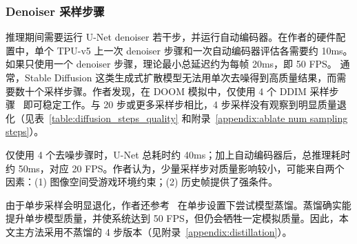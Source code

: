 \documentclass{article} %
\begin{document}
\subsubsection{Denoiser 采样步骤}
推理期间需要运行 U-Net denoiser 若干步，并运行自动编码器。在作者的硬件配置中，单个 TPU-v5 上一次 denoiser 步骤和一次自动编码器评估各需要约 10ms。如果只使用一个 denoiser 步骤，理论最小总延迟约为每帧 20ms，即 50 FPS。
通常，Stable Diffusion 这类生成式扩散模型无法用单次去噪得到高质量结果，而需要数十个采样步骤。作者发现，在 DOOM 模拟中，仅使用 4 个 DDIM 采样步骤~\citep{song2020denoising} 即可稳定工作。与 20 步或更多采样步相比，4 步采样没有观察到明显质量退化（见表~\ref{table:diffusion_steps_quality} 和附录~\ref{appendix:ablate num sampling steps}）。
\begin{table}[h]
\caption{\textbf{不同采样步数下的生成。} 使用 PSNR 和 LPIPS 指标评价 GameNGen 在不同采样步数下的生成质量。“D”表示一步蒸馏模型。更多细节见附录~\ref{appendix:distillation}。}
\label{table:diffusion_steps_quality}
\centering
\vspace{0.05in}
\end{table}
仅使用 4 个去噪步骤时，U-Net 总耗时约 40ms；加上自动编码器后，总推理耗时约 50ms，对应 20 FPS。作者认为，少量采样步对质量影响较小，可能来自两个因素：(1) 图像空间受游戏环境约束；(2) 历史帧提供了强条件。

由于单步采样会明显退化，作者还参考~\citep{yin2024onestep,wang2023prolificdreamer} 在单步设置下尝试模型蒸馏。蒸馏确实能提升单步模型质量，并使系统达到 50 FPS，但仍会牺牲一定模拟质量。因此，本文主方法采用不蒸馏的 4 步版本（见附录~\ref{appendix:distillation}）。%
\end{document}
